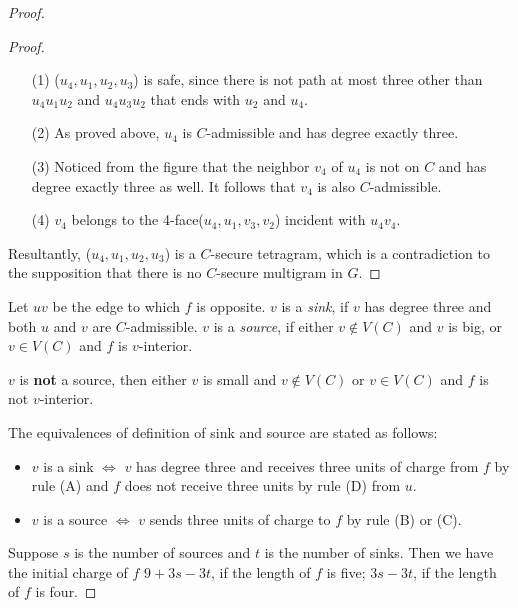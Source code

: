 \begin{proof}
\begin{proof}
\begin{itemize}
    \item[(1)] ($u_4, u_1, u_2, u_3$) is safe, since there is not path at most three other than $u_4u_1u_2$ and $u_4u_3u_2$ that ends with $u_2$ and $u_4$. 
    \item[(2)] As proved above, $u_4$ is $C$-admissible and has degree exactly three.
    \item[(3)] Noticed from the figure that the neighbor $v_4$ of $u_4$ is not on $C$ and has degree exactly three as well. It follows that $v_4$ is also $C$-admissible.
    \item[(4)] $v_4$ belongs to the 4-face($u_4, u_1, v_3, v_2$) incident with $u_4v_4$. 
\end{itemize}
Resultantly, ($u_4, u_1, u_2, u_3$) is a $C$-secure tetragram, which is a contradiction to the supposition that there is no $C$-secure multigram in $G$.
\end{proof}

\begin{definition}
Let $uv$ be the edge to which $f$ is opposite. $v$ is a \textit{sink}, if $v$ has degree three and both $u$ and $v$ are $C$-admissible. $v$ is a \textit{source}, if either $v \notin V(C)$ and $v$ is big, or $v \in V(C)$ and $f$ is $v$-interior.
\end{definition}

\begin{observation}
$v$ is \textbf{not} a source, then either $v$ is small and $v \notin V(C)$ or $v \in V(C)$ and $f$ is not $v$-interior.
\end{observation}

\begin{observation}
The equivalences of definition of sink and source are stated as follows:
\begin{itemize}
    \item $v$ is a sink $\Longleftrightarrow$ $v$ has degree three and receives three units of charge from $f$ by rule (A) and $f$ does not receive three units by rule (D) from $u$.
    \item $v$ is a source $\Longleftrightarrow$ $v$ sends three units of charge to $f$ by rule (B) or (C).
\end{itemize}
\end{observation}
Suppose $s$ is the number of sources and $t$ is the number of sinks. Then we have the initial charge of $f$ $9 + 3s - 3t$, if the length of $f$ is five; $3s - 3t$, if the length of $f$ is four. 


\end{proof}
